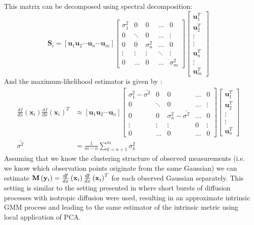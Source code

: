 This matrix can be decomposed using spectral decomposition:
\[
\mathbf{S}_{i}=\left[\mathbf{u}_{1}\mathbf{u}_{2}\cdots\mathbf{u}_{n}\cdots\mathbf{u}_{m}\right]\left[\begin{array}{ccccc}
\sigma_{1}^{2} & 0 & 0 & \ldots & 0\\
0 & \ddots & 0 & \ldots & \vdots\\
0 & 0 & \sigma_{n}^{2} & \ldots & 0\\
\vdots & \vdots & \vdots & \ddots & \vdots\\
0 & \ldots & 0 & \ldots & \sigma_{m}^{2}
\end{array}\right]\left[\begin{array}{c}
\mathbf{u}_{1}^{T}\\
\mathbf{u}_{2}^{T}\\
\vdots\\
\vdots\\
\mathbf{u}_{n}^{T}\\
\vdots\\
\mathbf{u}_{m}^{T}
\end{array}\right]
\]
And the maximum-likelihood estimator is given by \cite{tipping1999probabilistic}:
\begin{equation}
\begin{aligned}\frac{df}{dx}\left(\mathbf{x}_{i}\right)\frac{df}{dx}\left(\mathbf{x}_{i}\right)^{T} & \approx\left[\mathbf{u}_{1}\mathbf{u}_{2}\cdots\mathbf{u}_{n}\right]\left[\begin{array}{ccccc}
\sigma_{1}^{2}-\bar{\sigma^{2}} & 0 & 0 & \ldots & 0\\
0 & \ddots & 0 & \ldots & \vdots\\
0 & 0 & \sigma_{n}^{2}-\bar{\sigma^{2}} & \ldots & 0\\
\vdots & \vdots & \vdots & 0 & \vdots\\
0 & \ldots & 0 & \ldots & 0
\end{array}\right]\left[\begin{array}{c}
\mathbf{u}_{1}^{T}\\
\mathbf{u}_{2}^{T}\\
\vdots\\
\vdots\\
\mathbf{u}_{n}^{T}
\end{array}\right]\\
\bar{\sigma^{2}} & =\frac{1}{m-n}\sum_{k=n+1}^{m}\sigma_{k}^{2}
\end{aligned}
\end{equation}
Assuming that we know the clustering structure of observed measurements (i.e. we know which observation points originate from the same Gaussian)
we can estimate $\mathbf{M}\left({\bf y}_{i}\right)=\frac{df}{dx}\left(\mathbf{x}_{i}\right)\frac{df}{dx}\left(\mathbf{x}_{i}\right)^{T}$ for each observed Gaussian separately. This setting is similar to the setting presented in \cite{singer2008non} where short bursts of diffusion processes with isotropic diffusion were used, resulting in an approximate intrinsic \ac{GMM} process and leading to the same estimator of the intrinsic metric using local application of \ac{PCA}.

